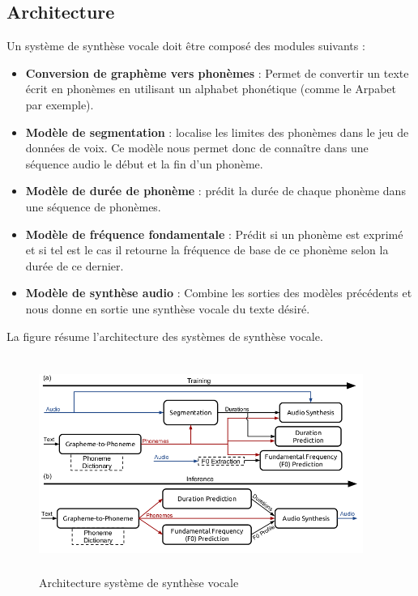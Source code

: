 \subsection{Architecture}
Un système de synthèse vocale doit être composé des modules suivants : \cite{textspeechmodules}

\begin{itemize}
    \item \textbf{Conversion de graphème vers phonèmes} : Permet de convertir un texte écrit en phonèmes en utilisant un alphabet phonétique (comme le Arpabet\cite{arpabet} par exemple).
    \item \textbf{Modèle de segmentation} : localise les limites des phonèmes dans le jeu de données de voix. Ce modèle nous permet donc de connaître dans une séquence audio le début et la fin d’un phonème.
    \item \textbf{Modèle de durée de phonème} : prédit la durée de chaque phonème dans une séquence de phonèmes.
    \item \textbf{Modèle de fréquence fondamentale} :  Prédit si un phonème est exprimé et si tel est le cas il retourne la fréquence de base de ce phonème selon la durée de ce dernier.
    \item \textbf{Modèle de synthèse audio} : Combine les sorties des modèles précédents et nous donne en sortie une synthèse vocale du texte désiré.
\end{itemize}

\newpage
La figure résume l'architecture des systèmes de synthèse vocale.

\begin{figure}[H]
    \centering
    \includegraphics[height=200pt,width=300pt]{images/chap1/architecture_tts.png}
    \caption{Architecture système de synthèse vocale\cite{textspeechmodules}}
\end{figure}